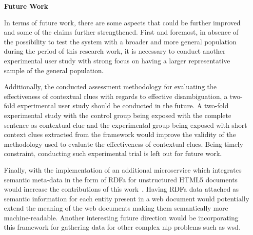 \textbf{Future Work}  \hfill \break




In terms of future work, there are some aspects that could be further improved and some of the claims further strengthened. First and foremost, in absence of the possibility to test the system with a broader and more general population during the period of this research work, it is necessary to conduct another experimental user study with strong focus on having a larger representative sample of the general population. 

Additionally, the conducted assessment methodology for evaluating the effectiveness of contextual clues with regards to effective disambiguation, a two-fold experimental user study should be conducted in the future. A two-fold experimental study with the control group being exposed with the complete sentence as contextual clue and the experimental group being exposed with short context clues extracted from the framework would improve the validity of the methodology used to evaluate the effectiveness of contextual clues. Being timely constraint, conducting such experimental trial is left out for future work.

Finally, with the implementation of an additional microservice which integrates semantic meta-data in the form of RDFa for unstructured HTML5 documents would increase the contributions of this work~\cite{rdfa}. Having RDFa data attached as semantic information for each entity present in a web document would potentially extend the meaning of the web documents making them semantically more machine-readable. Another interesting future direction would be incorporating this framework for gathering data for other complex \ac{nlp} problems such as \ac{wsd}. 